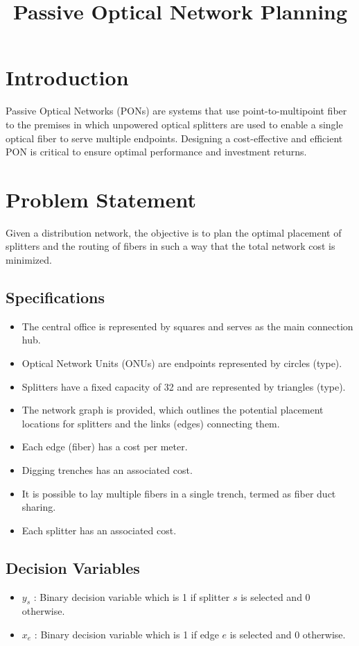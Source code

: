 \documentclass{article}
\title{Passive Optical Network Planning}
\date{}
\begin{document}
\maketitle

\section{Introduction}
Passive Optical Networks (PONs) are systems that use point-to-multipoint fiber to the premises in which unpowered optical splitters are used to enable a single optical fiber to serve multiple endpoints. Designing a cost-effective and efficient PON is critical to ensure optimal performance and investment returns.

\section{Problem Statement}
Given a distribution network, the objective is to plan the optimal placement of splitters and the routing of fibers in such a way that the total network cost is minimized. 

\subsection{Specifications}
\begin{itemize}
    \item The central office is represented by squares and serves as the main connection hub.
    \item Optical Network Units (ONUs) are endpoints represented by circles (type).
    \item Splitters have a fixed capacity of 32 and are represented by triangles (type).
    \item The network graph is provided, which outlines the potential placement locations for splitters and the links (edges) connecting them.
    \item Each edge (fiber) has a cost per meter.
    \item Digging trenches has an associated cost.
    \item It is possible to lay multiple fibers in a single trench, termed as fiber duct sharing.
    \item Each splitter has an associated cost.
\end{itemize}

\subsection{Decision Variables}
\begin{itemize}
    \item \( y_{s} \) : Binary decision variable which is 1 if splitter \( s \) is selected and 0 otherwise.
    \item \( x_{e} \) : Binary decision variable which is 1 if edge \( e \) is selected and 0 otherwise.
\end{itemize}
\end{document}
